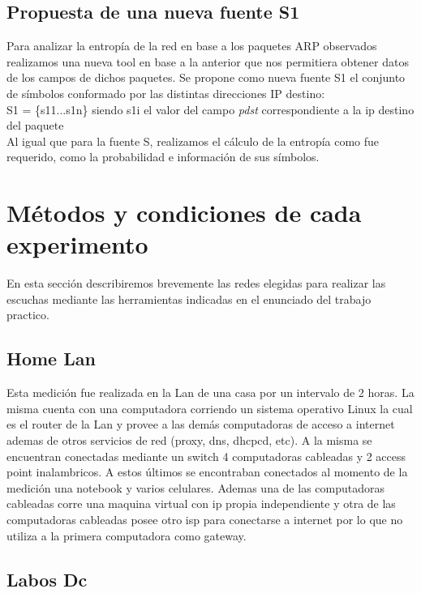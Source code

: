 \documentclass[final,inline,narroweqnarray,a4paper]{ieee}
\begin{document}
\subsection{Propuesta de una nueva fuente S{\scriptsize 1}} \label{ssec:fuenteS1}
Para analizar la entropía de la red en base a los paquetes ARP observados realizamos una nueva tool en base a la anterior que nos permitiera obtener datos de los campos de dichos paquetes. 
	Se propone como nueva fuente S1 el conjunto de símbolos conformado por las distintas direcciones IP destino:\\
	
	
		S{\scriptsize 1} = \{s{\scriptsize 1}{\tiny 1}...s{\scriptsize 1}{\tiny n}\} siendo s{\scriptsize 1}{\tiny i} el valor del campo \textit{pdst} correspondiente a la ip destino del paquete\\
		
	
	Al igual que para la fuente S, realizamos el cálculo de la entropía como fue requerido, como la probabilidad e información de sus símbolos.  

\section{Métodos y condiciones de cada experimento}

En esta sección describiremos brevemente las redes elegidas para realizar las escuchas mediante las herramientas indicadas en el enunciado del trabajo practico.

\subsection{Home Lan}

Esta medición fue realizada en la Lan de una casa por un intervalo de 2 horas. La misma cuenta con una computadora corriendo un sistema operativo Linux la cual es el router de la Lan y provee a las demás computadoras de acceso a internet ademas de otros servicios de red (proxy, dns, dhcpcd, etc). A la misma se encuentran conectadas mediante un switch 4 computadoras cableadas y 2 access point inalambricos. A estos últimos se encontraban conectados al momento de la medición una notebook y varios celulares. Ademas una de las computadoras cableadas corre una maquina virtual con ip propia independiente y otra de las computadoras cableadas posee otro isp para conectarse a internet por lo que no utiliza a la primera computadora como gateway.

\subsection{Labos Dc}
\end{document}
